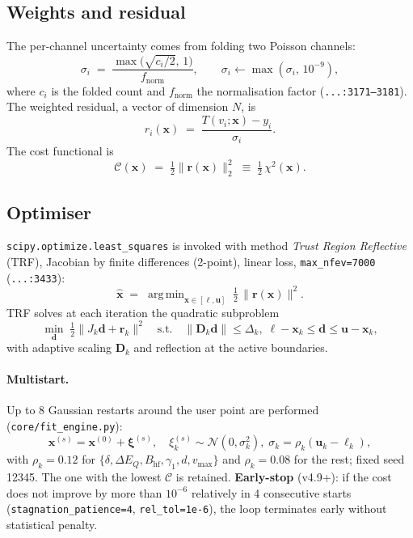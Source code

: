 \documentclass[11pt,a4paper]{article}
\newcommand{\BHF}{B_{\mathrm{hf}}}
\newcommand{\dEQ}{\Delta E_{Q}}
\newcommand{\code}[1]{\texttt{\small #1}}
\newcommand{\file}[1]{\textcolor{black!70}{\texttt{\small #1}}}
\DeclareMathOperator*{\argmin}{arg\,min}
\begin{document}
\subsection{Weights and residual}\label{sec:residuo}
The per-channel uncertainty comes from folding two Poisson channels:
\begin{equation}
  \sigma_i \;=\; \frac{\max\!\bigl(\sqrt{c_i/2},\,1\bigr)}{f_{\text{norm}}},
  \qquad \sigma_i \leftarrow \max(\sigma_i,\,10^{-9}),
  \label{eq:sigma}
\end{equation}
where $c_i$ is the folded count and $f_{\text{norm}}$ the normalisation factor (\file{...:3171--3181}). The weighted residual, a vector of dimension $N$, is
\begin{equation}
  r_i(\bm x) \;=\; \frac{T(v_i;\bm x)-y_i}{\sigma_i}.
  \label{eq:residuo}
\end{equation}
The cost functional is
\begin{equation}
  \mathcal C(\bm x) \;=\; \tfrac12 \|\bm r(\bm x)\|_{2}^{2}
   \;\equiv\; \tfrac12\,\chi^{2}(\bm x).
  \label{eq:cost_disc}
\end{equation}

\subsection{Optimiser}\label{sec:opt}
\code{scipy.optimize.least\_squares} is invoked with method \emph{Trust Region Reflective} (TRF), Jacobian by finite differences (2-point), linear loss, \code{max\_nfev=7000} (\file{...:3433}):
\begin{equation}
  \hat{\bm x} \;=\; \argmin_{\bm x \in [\bm\ell,\bm u]}\; \tfrac12\,\|\bm r(\bm x)\|^{2}.
\end{equation}
TRF solves at each iteration the quadratic subproblem
\begin{equation}
  \min_{\bm d}\;\tfrac12\|J_k\bm d + \bm r_k\|^{2}
  \quad\text{s.t.}\quad \|\bm D_k \bm d\|\le \Delta_k,\; \bm\ell-\bm x_k\le\bm d\le\bm u-\bm x_k,
\end{equation}
with adaptive scaling $\bm D_k$ and reflection at the active boundaries.

\paragraph{Multistart.} Up to 8 Gaussian restarts around the user point are performed (\file{core/fit\_engine.py}):
\begin{equation}
  \bm x^{(s)} = \bm x^{(0)} + \bm \xi^{(s)},\quad \xi^{(s)}_k \sim \mathcal N(0,\sigma_k^{2}),\;\sigma_k=\rho_k(\bm u_k-\bm\ell_k),
\end{equation}
with $\rho_k=0{.}12$ for $\{\delta,\dEQ,\BHF,\gamma_1,d,v_{\max}\}$ and $\rho_k=0{.}08$ for the rest; fixed seed 12345. The one with the lowest $\mathcal C$ is retained. \textbf{Early-stop} (v4.9+): if the cost does not improve by more than $10^{-6}$ relatively in 4 consecutive starts (\code{stagnation\_patience=4}, \code{rel\_tol=1e-6}), the loop terminates early without statistical penalty.
\end{document}
